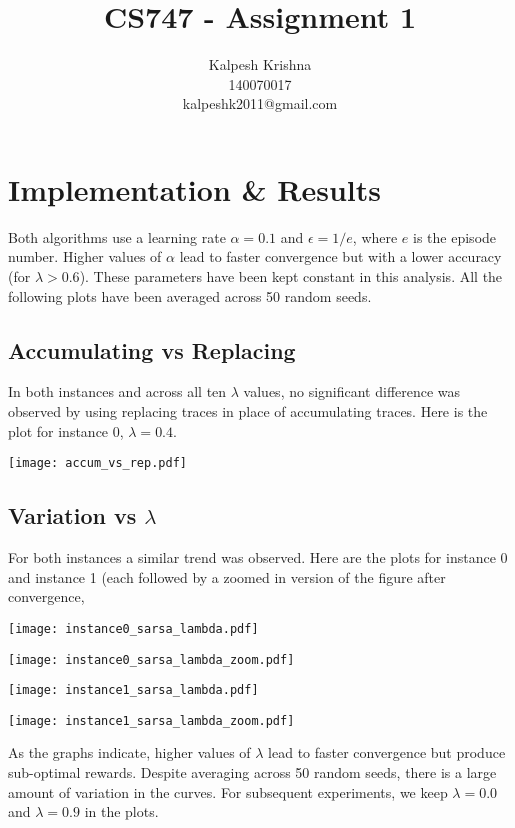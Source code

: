 \documentclass[11pt]{article}
\title{\textbf{CS747 - Assignment 1}}
\author{Kalpesh Krishna\\140070017\\kalpeshk2011@gmail.com}
\date{}
\begin{document}
\maketitle

\section{Implementation \& Results}
Both algorithms use a learning rate $\alpha = 0.1$ and $\epsilon = 1/e$, where $e$ is the episode number. Higher values of $\alpha$ lead to faster convergence but with a lower accuracy (for $\lambda > 0.6$). These parameters have been kept constant in this analysis. All the following plots have been averaged across 50 random seeds.
\subsection{Accumulating vs Replacing}
In both instances and across all ten $\lambda$ values, no significant difference was observed by using replacing traces in place of accumulating traces. Here is the plot for instance $0$, $\lambda = 0.4$.
\begin{center}
\texttt{[image: accum\_vs\_rep.pdf]}
\end{center}
\subsection{Variation vs $\lambda$}
For both instances a similar trend was observed. Here are the plots for instance 0 and instance 1 (each followed by a zoomed in version of the figure after convergence,
\begin{center}
\texttt{[image: instance0\_sarsa\_lambda.pdf]}
\end{center}
\begin{center}
\texttt{[image: instance0\_sarsa\_lambda\_zoom.pdf]}
\end{center}
\begin{center}
\texttt{[image: instance1\_sarsa\_lambda.pdf]}
\end{center}
\begin{center}
\texttt{[image: instance1\_sarsa\_lambda\_zoom.pdf]}
\end{center}
\pagebreak
As the graphs indicate, higher values of $\lambda$ lead to faster convergence but produce sub-optimal rewards. Despite averaging across 50 random seeds, there is a large amount of variation in the curves. For subsequent experiments, we keep $\lambda = 0.0$ and $\lambda = 0.9$ in the plots.
\end{document}
